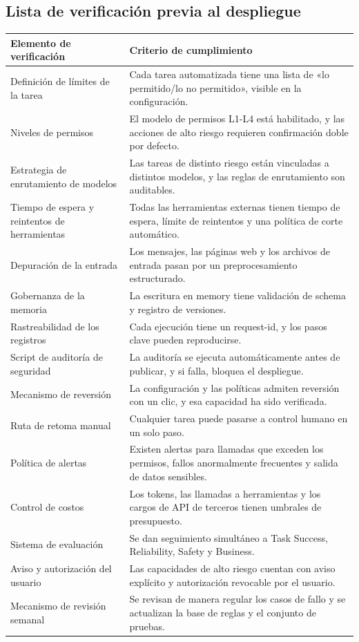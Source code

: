 \documentclass[a4paper]{article}
\begin{document}
\subsection{Lista de verificación previa al despliegue}
\begin{longtable}{p{}p{}}
\toprule
\textbf{Elemento de verificación} & \textbf{Criterio de cumplimiento} \\
\midrule
Definición de límites de la tarea & Cada tarea automatizada tiene una lista de «lo permitido/lo no permitido», visible en la configuración. \\
\midrule
Niveles de permisos & El modelo de permisos L1-L4 está habilitado, y las acciones de alto riesgo requieren confirmación doble por defecto. \\
\midrule
Estrategia de enrutamiento de modelos & Las tareas de distinto riesgo están vinculadas a distintos modelos, y las reglas de enrutamiento son auditables. \\
\midrule
Tiempo de espera y reintentos de herramientas & Todas las herramientas externas tienen tiempo de espera, límite de reintentos y una política de corte automático. \\
\midrule
Depuración de la entrada & Los mensajes, las páginas web y los archivos de entrada pasan por un preprocesamiento estructurado. \\
\midrule
Gobernanza de la memoria & La escritura en memory tiene validación de schema y registro de versiones. \\
\midrule
Rastreabilidad de los registros & Cada ejecución tiene un request-id, y los pasos clave pueden reproducirse. \\
\midrule
Script de auditoría de seguridad & La auditoría se ejecuta automáticamente antes de publicar, y si falla, bloquea el despliegue. \\
\midrule
Mecanismo de reversión & La configuración y las políticas admiten reversión con un clic, y esa capacidad ha sido verificada. \\
\midrule
Ruta de retoma manual & Cualquier tarea puede pasarse a control humano en un solo paso. \\
\midrule
Política de alertas & Existen alertas para llamadas que exceden los permisos, fallos anormalmente frecuentes y salida de datos sensibles. \\
\midrule
Control de costos & Los tokens, las llamadas a herramientas y los cargos de API de terceros tienen umbrales de presupuesto. \\
\midrule
Sistema de evaluación & Se dan seguimiento simultáneo a Task Success, Reliability, Safety y Business. \\
\midrule
Aviso y autorización del usuario & Las capacidades de alto riesgo cuentan con aviso explícito y autorización revocable por el usuario. \\
\midrule
Mecanismo de revisión semanal & Se revisan de manera regular los casos de fallo y se actualizan la base de reglas y el conjunto de pruebas. \\
\bottomrule
\end{longtable}
\end{document}
